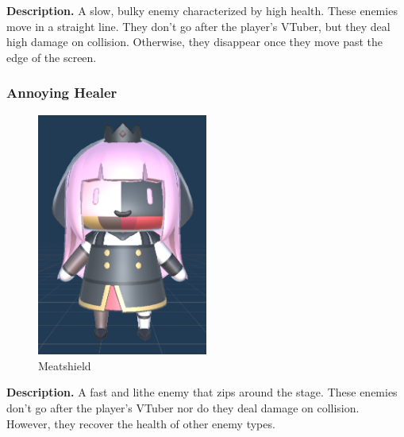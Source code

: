 \documentclass[10pt, a4paper]{article}
\begin{document}
	\textbf{Description.} A slow, bulky enemy characterized by high health. These enemies move in a straight line. They don't go after the player's VTuber, but they deal high damage on collision. Otherwise, they disappear once they move past the edge of the screen.

	\subsubsection{Annoying Healer}

	\begin{figure}[H]
		\centering
		\includegraphics[width=0.5\textwidth]{images/smol_calli1.png}
		\caption{Meatshield}
		\label{fig:annoyinghealer}
	\end{figure}

	\textbf{Description.} A fast and lithe enemy that zips around the stage. These enemies don't go after the player's VTuber nor do they deal damage on collision. However, they recover the health of other enemy types.
\end{document}
